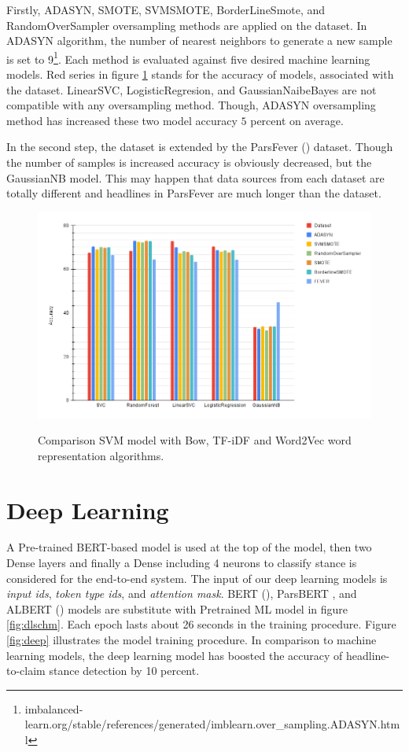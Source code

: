 Firstly, ADASYN, SMOTE, SVMSMOTE, BorderLineSmote, and RandomOverSampler oversampling methods are applied on the \cite{stance_persian} dataset. In ADASYN algorithm, the number of nearest neighbors to generate a new sample is set to 9\footnote{imbalanced-learn.org/stable/references/generated/imblearn.over\_sampling.ADASYN.html}. Each method is evaluated against five desired machine learning models. Red series in figure \ref{fig:balanc} stands for the accuracy of models, associated with the \cite{stance_persian} dataset. LinearSVC, LogisticRegresion, and GaussianNaibeBayes are not compatible with any oversampling method. Though, ADASYN oversampling method has increased these two model accuracy $5$ percent on average.


In the second step, the dataset is extended by the ParsFever (\cite{parsfever}) dataset. Though the number of samples is increased accuracy is obviously decreased, but the GaussianNB model. This may happen that data sources from each dataset are totally different and headlines in ParsFever are much longer than the \cite{stance_persian} dataset.
\begin{figure}%
	\centering
	{\includegraphics[width=14.5cm]{statistics/balancing.png} }
	\caption{Comparison SVM model with Bow, TF-iDF and Word2Vec word representation algorithms.}%
	\label{fig:balanc}%
\end{figure}

\section{Deep Learning}

\label{sec:dl}
A Pre-trained BERT-based model is used at the top of the model, then two Dense layers and finally a Dense including 4 neurons to classify stance is considered for the end-to-end system. The input of our deep learning models is \textit{input ids}, \textit{token type ids}, and \textit{attention mask}.
BERT (\cite{bert}), ParsBERT \cite{parsbert}, and ALBERT (\cite{albert}) models are substitute with Pretrained ML model in figure \ref{fig:dlschm}. Each epoch lasts about 26 seconds in the training procedure. Figure \ref{fig:deep} illustrates the model training procedure. In comparison to machine learning models, the deep learning model has boosted the accuracy of headline-to-claim stance detection by 10 percent. 

